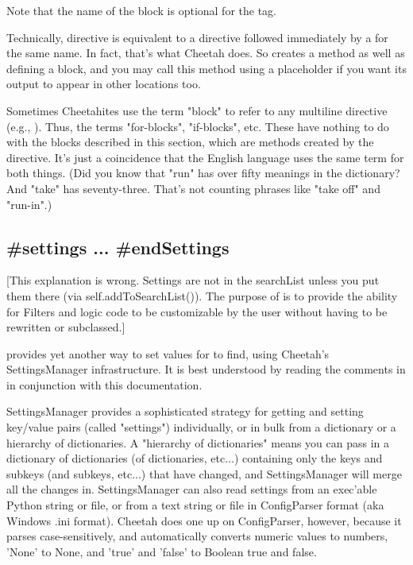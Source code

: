 Note that the name of the block is optional for the  tag.

Technically,  directive is equivalent to a  directive
followed immediately by a  for the same name.  In fact,
that's what Cheetah does.  So  creates a method as well as
defining a block, and you may call this method using a placeholder if you want
its output to appear in other locations too.

Sometimes Cheetahites use the term "block" to refer to any multiline directive
(e.g., ).  Thus, the terms "for-blocks", "if-blocks",
etc.  These have nothing to do with the blocks described in this section, which
are methods created by the  directive.  It's just a coincidence
that the English language uses the same term for both things.  (Did you know 
that "run" has over fifty meanings in the dictionary?  And "take" has
seventy-three.  That's not counting phrases like "take off" and "run-in".)


\subsection{\#settings ... \#endSettings}
\label{inheritanceEtc.settings}

[This explanation is wrong.  Settings are not in the searchList unless you
put them there (via self.addToSearchList()).  The purpose of
 is to provide the ability for Filters and logic code to be
customizable by the user without having to be rewritten or subclassed.]


 provides yet another way to set values for
 to find, using Cheetah's SettingsManager infrastructure.
It is best understood by reading the comments in
 in conjunction with this documentation.

SettingsManager provides a sophisticated strategy for getting and setting
key/value pairs (called "settings") individually, or in bulk from a dictionary
or a hierarchy of dictionaries.  A "hierarchy of dictionaries" means you can
pass in a dictionary of dictionaries (of dictionaries, etc...) containing only
the keys and subkeys (and subkeys, etc...) that have changed, and
SettingsManager will merge all the changes in.  SettingsManager can also read
settings from an exec'able Python string or file, or from a text string or file in ConfigParser format (aka Windows .ini format).  Cheetah does one up on 
ConfigParser, however, because it parses case-sensitively, and automatically
converts numeric values to numbers, 'None' to None, and 'true' and 'false' to
Boolean true and false.  

